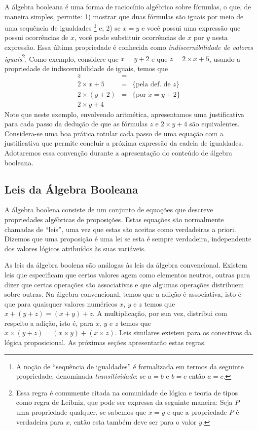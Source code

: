 A álgebra booleana é uma forma de raciocínio algébrico sobre
fórmulas, o que, de maneira simples, permite: 1) mostrar que duas
fórmulas são iguais por meio de uma sequência de igualdades \footnote{A
noção de ``sequência de igualdades'' é formalizada em termos da
seguinte propriedade, denominada \emph{transitividade}: se $a= b$ e $b
= c$ então $a = c$.} e; 2) se $x = y$ e você possui uma expressão que
possui ocorrências de $x$, você pode substituir ocorrências de
$x$ por $y$ nesta expressão. Essa última propriedade é conhecida como
\emph{indiscernibilidade de valores iguais}\footnote{Essa regra é
  comumente citada na comunidade de lógica e teoria de tipos como
  regra de Leibniz, que pode ser expressa da seguinte maneira: Seja
  $P$ uma propriedade qualquer, se sabemos que $x = y$ e que a
  propriedade $P$ é verdadeira para $x$, então esta também deve ser
  para o valor $y$.}. Como exemplo, considere
que $x = y + 2$ e que $z = 2 \times x + 5$, usando a propriedade de
indiscernibilidade de iguais, temos que
\[
\begin{array}{lcl}
z & = & \\
2 \times x + 5 & = & \{\text{pela def. de }z\}\\
2\times (y + 2) & = & \{\text{por }x = y + 2\}\\
2\times y + 4
\end{array}
\]
Note que neste exemplo, envolvendo aritmética, apresentamos uma
justificativa para cada passo da dedução de que as fórmulas $z$ e
$2\times y + 4$ são equivalentes. Considera-se uma boa prática rotular
cada passo de uma equação com a justificativa que permite concluir a
próxima expressão da cadeia de igualdades. Adotaremos essa convenção
durante a apresentação do conteúdo de álgebra booleana.

\subsection{Leis da Álgebra Booleana}

A álgebra boolena consiste de um conjunto de equações que descreve
propriedades algébricas de proposições. Estas equações são normalmente
chamadas de ``leis'', uma vez que estas são aceitas como verdadeiras a
priori. Dizemos que uma proposição é uma lei se esta é sempre
verdadeira, independente dos valores lógicos atribuídos às suas variáveis.

As leis da álgebra boolena são análogas às leis da álgebra
convencional. Existem leis que especificam que certos valores agem
como elementos neutros, outras para dizer que certas operações são
associativas e que algumas operações distribuem sobre outras. Na
álgebra convencional, temos que a adição é associativa, isto é que
para quaisquer valores numéricos $x$, $y$ e $z$ temos que $x + (y + z)
= (x + y) + z$. A multiplicação, por sua vez, distribui com respeito a
adição, isto é, para $x$, $y$ e $z$ temos que $x \times (y + z) = (x \times
y) + (x \times z)$.  Leis similares existem para os conectivos da
lógica proposicional. As próximas seções apresentarão estas regras.

